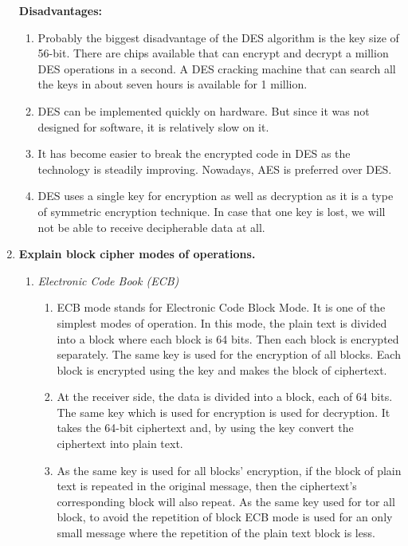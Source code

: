 \documentclass[openany]{book}
\begin{document}
\begin{enumerate}
	      \textbf{Disadvantages:}
	      \begin{enumerate}
		      \item Probably the biggest disadvantage of the DES algorithm is the key size of 56-bit. There are chips available that can encrypt and decrypt a million DES operations in a second. A DES cracking machine that can search all the keys in about seven hours is available for 1 million.
		      \item DES can be implemented quickly on hardware. But since it was not designed for software, it is relatively slow on it.
		      \item It has become easier to break the encrypted code in DES as the technology is steadily improving. Nowadays, AES is preferred over DES.
		      \item DES uses a single key for encryption as well as decryption as it is a type of symmetric encryption technique. In case that one key is lost, we will not be able to receive decipherable data at all.
	      \end{enumerate}

	\item \textbf{Explain block cipher modes of operations.}\\
	      \begin{enumerate}
		      \item \textit{Electronic Code Book (ECB)}
		            \begin{enumerate}
			            \item ECB mode stands for Electronic Code Block Mode. It is one of the simplest modes of operation. In this mode, the plain text is divided into a block where each block is 64 bits. Then each block is encrypted separately. The same key is used for the encryption of all blocks. Each block is encrypted using the key and makes the block of ciphertext.
			            \item At the receiver side, the data is divided into a block, each of 64 bits. The same key which is used for encryption is used for decryption. It takes the 64-bit ciphertext and, by using the key convert the ciphertext into plain text.
			            \item As the same key is used for all blocks’ encryption, if the block of plain text is repeated in the original message, then the ciphertext’s corresponding block will also repeat. As the same key used for tor all block, to avoid the repetition of block ECB mode is used for an only small message where the repetition of the plain text block is less.
		            \end{enumerate}


\end{enumerate}
\end{enumerate}
\end{document}
